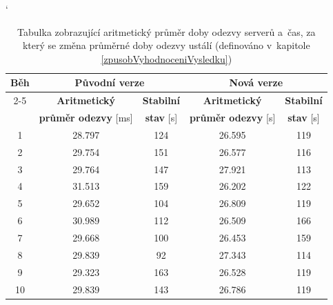             \begin{table}[ht]
             \catcode`
             \begin{adjustwidth}{-0.5cm}{}
             \begin{center}
              \begin{tabular}{| c || c | c || c | c |} \hline
                \multirow{4}{*}{Běh}  &   \multicolumn{2}{c||}{\textbf{Původní verze}}  &  \multicolumn{2}{c|}{\textbf{Nová verze}}\\ \cline{2-5}
                 & \textbf{Aritmetický} &  \textbf{Stabilní} &  \textbf{Aritmetický}  &  \textbf{Stabilní}\\  
                 & \textbf{průměr odezvy} [ms]  &   \textbf{stav} [s]  &  \textbf{průměr odezvy} [s] &  \textbf{stav} [s]\\\hline
                1 & 28.797 & 124 &  26.595 & 119\\\hline
                2  & 29.754 & 151 & 26.577 & 116\\\hline
                3 & 29.764 & 147 & 27.921 & 113\\\hline
                4 & 31.513  & 159 & 26.202 & 122\\\hline
                5 & 29.652 & 104 & 26.809 & 119\\\hline\hline
                6 & 30.989 & 112 & 26.509 & 166\\\hline
                7 & 29.668 & 100 & 26.453 & 159\\\hline
                8 & 29.839 & 92 & 27.343 & 114\\\hline
                9 & 29.323 & 163 & 26.528 & 119\\\hline
                10 & 29.839 & 143 & 26.786 & 119\\\hline
              \end{tabular}
              \caption{Tabulka zobrazující aritmetický průměr doby odezvy serverů a~čas, za který se změna průměrné doby odezvy ustálí 
                (definováno v~kapitole \ref{zpusobVyhodnoceniVysledku}) }
              \label{tabMainPageMain}
             \end{center}
            \end{adjustwidth}
            \end{table}

